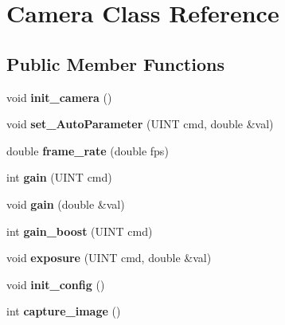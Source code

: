 \hypertarget{classCamera}{\section{Camera Class Reference}
\label{classCamera}
}
\subsection*{Public Member Functions}
\begin{DoxyCompactItemize}
\item 
\hypertarget{classCamera_ad24264a56f7dbef2ddd202b65e8a8cde}{void {\bfseries init\-\_\-camera} ()}\label{classCamera_ad24264a56f7dbef2ddd202b65e8a8cde}

\item 
\hypertarget{classCamera_a14f056cbef5d626b0ad17f1b0a84e139}{void {\bfseries set\-\_\-\-Auto\-Parameter} (U\-I\-N\-T cmd, double \&val)}\label{classCamera_a14f056cbef5d626b0ad17f1b0a84e139}

\item 
\hypertarget{classCamera_ae6316b4da0fd2e0daaf85cfa980a82a2}{double {\bfseries frame\-\_\-rate} (double fps)}\label{classCamera_ae6316b4da0fd2e0daaf85cfa980a82a2}

\item 
\hypertarget{classCamera_afa909bbdf600871c288ff607ca4877e6}{int {\bfseries gain} (U\-I\-N\-T cmd)}\label{classCamera_afa909bbdf600871c288ff607ca4877e6}

\item 
\hypertarget{classCamera_a685e24b45a50a32a5acd7119ac14cb86}{void {\bfseries gain} (double \&val)}\label{classCamera_a685e24b45a50a32a5acd7119ac14cb86}

\item 
\hypertarget{classCamera_a5745bbcaf0aff62ade2c6d952803c48b}{int {\bfseries gain\-\_\-boost} (U\-I\-N\-T cmd)}\label{classCamera_a5745bbcaf0aff62ade2c6d952803c48b}

\item 
\hypertarget{classCamera_a48381812a08a83b2af145e1ff7becb4c}{void {\bfseries exposure} (U\-I\-N\-T cmd, double \&val)}\label{classCamera_a48381812a08a83b2af145e1ff7becb4c}

\item 
\hypertarget{classCamera_af318991ff88175df0ca94a9e2969af2a}{void {\bfseries init\-\_\-config} ()}\label{classCamera_af318991ff88175df0ca94a9e2969af2a}

\item 
\hypertarget{classCamera_ac9dd7a6ef664533299dec570c3f89ab1}{int {\bfseries capture\-\_\-image} ()}\label{classCamera_ac9dd7a6ef664533299dec570c3f89ab1}


\end{DoxyCompactItemize}
